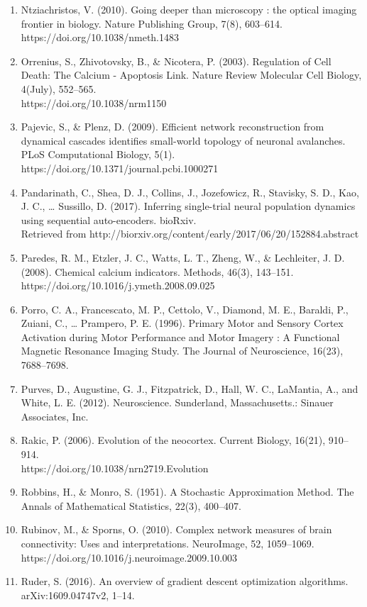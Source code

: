 \documentclass[11pt,titlepage]{article}
\begin{document}
\begin{spacing}{1}
\begin{enumerate}
\item Ntziachristos, V. (2010). Going deeper than microscopy : the optical imaging frontier in biology. Nature Publishing Group, 7(8), 603–614. https://doi.org/10.1038/nmeth.1483
\item Orrenius, S., Zhivotovsky, B., \& Nicotera, P. (2003). Regulation of Cell Death: The Calcium - Apoptosis Link. Nature Review Molecular Cell Biology, 4(July), 552–565.\\ https://doi.org/10.1038/nrm1150
\item Pajevic, S., \& Plenz, D. (2009). Efficient network reconstruction from dynamical cascades identifies small-world topology of neuronal avalanches. PLoS Computational Biology, 5(1). https://doi.org/10.1371/journal.pcbi.1000271
\item Pandarinath, C., Shea, D. J., Collins, J., Jozefowicz, R., Stavisky, S. D., Kao, J. C., … Sussillo, D. (2017). Inferring single-trial neural population dynamics using sequential auto-encoders. bioRxiv.\\Retrieved from http://biorxiv.org/content/early/2017/06/20/152884.abstract
\item Paredes, R. M., Etzler, J. C., Watts, L. T., Zheng, W., \& Lechleiter, J. D. (2008). Chemical calcium indicators. Methods, 46(3), 143–151. https://doi.org/10.1016/j.ymeth.2008.09.025
\item Porro, C. A., Francescato, M. P., Cettolo, V., Diamond, M. E., Baraldi, P., Zuiani, C., … Prampero, P. E. (1996). Primary Motor and Sensory Cortex Activation during Motor Performance and Motor Imagery : A Functional Magnetic Resonance Imaging Study. The Journal of Neuroscience, 16(23), 7688–7698.
\item Purves, D., Augustine, G. J., Fitzpatrick, D., Hall, W. C., LaMantia, A., and White, L. E. (2012). Neuroscience. Sunderland, Massachusetts.: Sinauer Associates, Inc.
\item Rakic, P. (2006). Evolution of the neocortex. Current Biology, 16(21), 910–914. \\https://doi.org/10.1038/nrn2719.Evolution
\item Robbins, H., \& Monro, S. (1951). A Stochastic Approximation Method. The Annals of Mathematical Statistics, 22(3), 400–407.
\item Rubinov, M., \& Sporns, O. (2010). Complex network measures of brain connectivity: Uses and interpretations. NeuroImage, 52, 1059–1069.\\ https://doi.org/10.1016/j.neuroimage.2009.10.003
\item Ruder, S. (2016). An overview of gradient descent optimization algorithms.\\ arXiv:1609.04747v2, 1–14.

\end{enumerate}
\end{spacing}
\end{document}
